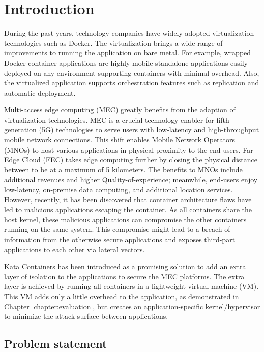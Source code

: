 \chapter{Introduction}
\label{chapter:intro}

During the past years, technology companies have widely adopted virtualization technologies such as Docker. The virtualization brings a wide range of improvements to running the application on bare metal. For example, wrapped Docker container applications are highly mobile standalone applications easily deployed on any environment supporting containers with minimal overhead. Also, the virtualized application supports orchestration features such as replication and automatic deployment.

Multi-access edge computing (MEC) greatly benefits from the adaption of virtualization technologies. MEC is a crucial technology enabler for fifth generation (5G) technologies to serve users with low-latency and high-throughput mobile network connections. This shift enables Mobile Network Operators (MNOs) to host various applications in physical proximity to the end-users. Far Edge Cloud (FEC) takes edge computing further by closing the physical distance between to be at a maximum of 5 kilometers. The benefits to MNOs include additional revenues and higher Quality-of-experience; meanwhile, end-users enjoy low-latency, on-premise data computing, and additional location services. However, recently, it has been discovered that container architecture flaws have led to malicious applications escaping the container. As all containers share the host kernel, these malicious applications can compromise the other containers running on the same system. This compromise might lead to a breach of information from the otherwise secure applications and exposes third-part applications to each other via lateral vectors.

Kata Containers \cite{KataContainers} has been introduced as a promising solution to add an extra layer of isolation to the applications to secure the MEC platforms. The extra layer is achieved by running all containers in a lightweight virtual machine (VM). This VM adds only a little overhead to the application, as demonstrated in Chapter \ref{chapter:evaluation}, but creates an application-specific kernel/hypervisor to minimize the attack surface between applications.

\section{Problem statement}
\label{section:intro_problemstatement}

